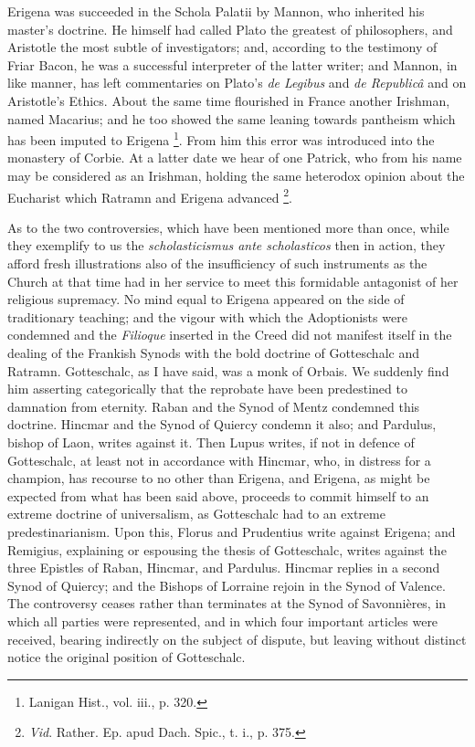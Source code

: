 Erigena was succeeded in the Schola Palatii by Mannon, who
inherited his master's doctrine. He himself had called Plato the
greatest of philosophers, and Aristotle the most subtle of
investigators; and, according to the testimony of Friar Bacon, he was
a successful interpreter of the latter writer; and Mannon, in like
manner, has left commentaries on Plato's \emph{de Legibus} and \emph{de
Republicâ} and on Aristotle's Ethics. About the same time
flourished in France another Irishman, named Macarius; and he too
showed the same leaning towards pantheism which has been imputed to
Erigena \footnote{Lanigan Hist.,
vol. iii., p. 320.}. From him this
error was introduced into the monastery of Corbie. At a latter date we
hear of one Patrick, who from his name may be considered as an
Irishman, holding the same heterodox opinion about the Eucharist which
Ratramn and Erigena advanced \footnote{\emph{Vid}.
Rather. Ep. apud Dach. Spic., t. i., p. 375.}.

As to the two controversies, which have been mentioned more than
once, while they exemplify to us the \emph{scholasticismus ante
scholasticos} then in action, they afford fresh illustrations also
of the insufficiency of such instruments as the Church at that time
had in her service to meet this formidable antagonist of her religious
supremacy. No mind equal to Erigena appeared on the side of
traditionary teaching; and the vigour with which the Adoptionists were
condemned and the \emph{Filioque} inserted in the Creed did not
manifest itself in the dealing of the Frankish Synods with the bold
doctrine of Gotteschalc and Ratramn. Gotteschalc, as I have said, was
a monk of Orbais. We suddenly find him asserting categorically that
the reprobate have been predestined to damnation from eternity. Raban
and the Synod of Mentz condemned this doctrine. Hincmar and the Synod
of Quiercy condemn it also; and Pardulus, bishop of Laon, writes
against it. Then Lupus writes, if not in defence of Gotteschalc, at
least not in accordance with Hincmar, who, in distress for a champion,
has recourse to no other than Erigena, and Erigena, as might be
expected from what has been said above, proceeds to commit himself to
an extreme doctrine of universalism, as Gotteschalc had to an
extreme predestinarianism. Upon this, Florus and Prudentius write
against Erigena; and Remigius, explaining or espousing the thesis of
Gotteschalc, writes against the three Epistles of Raban, Hincmar, and
Pardulus. Hincmar replies in a second Synod of Quiercy; and the
Bishops of Lorraine rejoin in the Synod of Valence. The controversy
ceases rather than terminates at the Synod of Savonnières, in which
all parties were represented, and in which four important articles
were received, bearing indirectly on the subject of dispute, but
leaving without distinct notice the original position of Gotteschalc.


